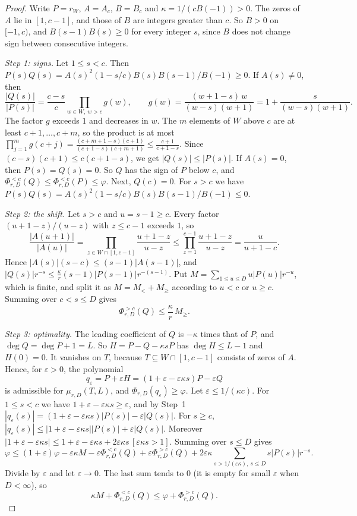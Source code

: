 \documentclass[11pt]{article}
\begin{document}
\begin{proof}
Write $P=r_W$, $A=A_c$, $B=B_c$ and $\kappa=1/(cB(-1))>0$.  The zeros of $A$
lie in $[1,c-1]$, and those of $B$ are integers greater than $c$.  So $B>0$ on
$[-1,c)$, and $B(s-1)B(s)\ge0$ for every integer $s$, since $B$ does not
change sign between consecutive integers.

\emph{Step 1: signs.}  Let $1\le s<c$.  Then $P(s)Q(s)=A(s)^2(1-s/c)B(s)B(s-1)/B(-1)\ge0$.  If
$A(s)\ne0$, then
\[
  \frac{|Q(s)|}{|P(s)|}=\frac{c-s}c\prod_{w\in W,\ w>c}g(w),\qquad
  g(w)=\frac{(w+1-s)\,w}{(w-s)(w+1)}=1+\frac s{(w-s)(w+1)} .
\]
The factor $g$ exceeds $1$ and decreases in $w$.  The $m$ elements of $W$
above $c$ are at least $c+1,\ldots,c+m$, so the product is at most
$\prod_{j=1}^mg(c+j)=\frac{(c+m+1-s)(c+1)}{(c+1-s)(c+m+1)}\le\frac{c+1}{c+1-s}$.
Since $(c-s)(c+1)\le c(c+1-s)$, we get $|Q(s)|\le|P(s)|$.  If $A(s)=0$, then
$P(s)=Q(s)=0$.  So $Q$ has the sign of $P$ below $c$, and
$\Phi_{r,D}^{<c}(Q)\le\Phi_{r,D}^{<c}(P)\le\varphi$.  Next, $Q(c)=0$.  For
$s>c$ we have $P(s)Q(s)=A(s)^2(1-s/c)B(s)B(s-1)/B(-1)\le0$.

\emph{Step 2: the shift.}  Let $s>c$ and $u=s-1\ge c$.  Every factor
$(u+1-z)/(u-z)$ with $z\le c-1$ exceeds $1$, so
\[
  \frac{|A(u+1)|}{|A(u)|}=\prod_{z\in W\cap[1,c-1]}\frac{u+1-z}{u-z}
  \le\prod_{z=1}^{c-1}\frac{u+1-z}{u-z}=\frac u{u+1-c} .
\]
Hence $|A(s)|(s-c)\le(s-1)|A(s-1)|$, and
$|Q(s)|r^{-s}\le\frac\kappa r(s-1)|P(s-1)|r^{-(s-1)}$.  Put
$M=\sum_{1\le u\le D}u|P(u)|r^{-u}$, which is finite, and split it as
$M=M_<+M_\ge$ according to $u<c$ or $u\ge c$.  Summing over $c<s\le D$ gives
\[
  \Phi_{r,D}^{>c}(Q)\le\frac\kappa r\,M_\ge .
\]

\emph{Step 3: optimality.}  The leading coefficient of $Q$ is $-\kappa$ times
that of $P$, and $\deg Q=\deg P+1=L$.  So $H=P-Q-\kappa sP$ has
$\deg H\le L-1$ and $H(0)=0$.  It vanishes on $T$, because $T\subseteq W\cap[1,c-1]$
consists of zeros of $A$.  Hence, for $\varepsilon>0$, the polynomial
\[
  q_\varepsilon=P+\varepsilon H=(1+\varepsilon-\varepsilon\kappa s)P-\varepsilon Q
\]
is admissible for $\mu_{r,D}(T,L)$, and $\Phi_{r,D}(q_\varepsilon)\ge\varphi$.
Let $\varepsilon\le1/(\kappa c)$.  For $1\le s<c$ we have
$1+\varepsilon-\varepsilon\kappa s\ge\varepsilon$, and by Step~1
$|q_\varepsilon(s)|=(1+\varepsilon-\varepsilon\kappa s)|P(s)|-\varepsilon|Q(s)|$.
For $s\ge c$, $|q_\varepsilon(s)|\le|1+\varepsilon-\varepsilon\kappa s||P(s)|+\varepsilon|Q(s)|$.
Moreover
$|1+\varepsilon-\varepsilon\kappa s|\le1+\varepsilon-\varepsilon\kappa s+2\varepsilon\kappa s\,[\varepsilon\kappa s>1]$.
Summing over $s\le D$ gives
\[
  \varphi\le(1+\varepsilon)\varphi-\varepsilon\kappa M
  -\varepsilon\Phi_{r,D}^{<c}(Q)+\varepsilon\Phi_{r,D}^{>c}(Q)
  +2\varepsilon\kappa\!\!\sum_{s>1/(\varepsilon\kappa),\ s\le D}\!\!s|P(s)|r^{-s}.
\]
Divide by $\varepsilon$ and let $\varepsilon\to0$.  The last sum tends to $0$
(it is empty for small $\varepsilon$ when $D<\infty$), so
\[
  \kappa M+\Phi_{r,D}^{<c}(Q)\le\varphi+\Phi_{r,D}^{>c}(Q).
\]


\end{proof}
\end{document}
